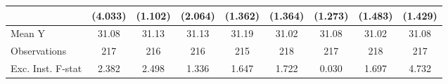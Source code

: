 {\begin{tabular}{l*{8}{c}}
                    &     (4.033)         &     (1.102)         &     (2.064)         &     (1.362)         &     (1.364)         &     (1.273)         &     (1.483)         &     (1.429)         \\
\midrule
Mean Y              &       31.08         &       31.13         &       31.13         &       31.19         &       31.02         &       31.08         &       31.02         &       31.08         \\
Observations        &         217         &         216         &         216         &         215         &         218         &         217         &         218         &         217         \\
Exc. Inst. F-stat   &       2.382         &       2.498         &       1.336         &       1.647         &       1.722         &       0.030         &       1.697         &       4.732         \\
\bottomrule
\end{tabular}
}
